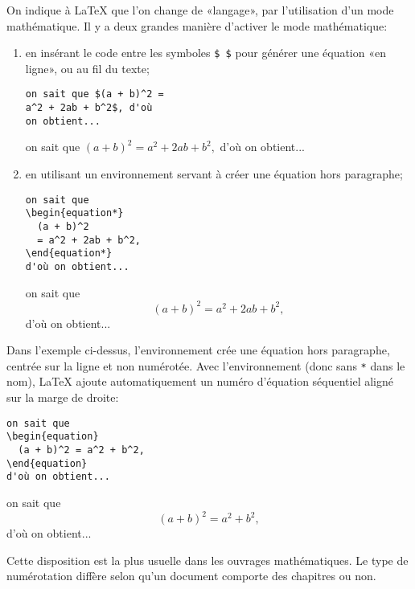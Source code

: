 On indique à {\LaTeX} que l'on change de «langage», par l'utilisation
d'un mode mathématique. Il y a deux grandes manière d'activer le mode
mathématique:
\begin{enumerate}
\item en insérant le code entre les symboles \verb=$ $= pour générer
  une équation «en ligne», ou au fil du texte;
  \begin{demo}
    \begin{texample}
\begin{lstlisting}
on sait que $(a + b)^2 =
a^2 + 2ab + b^2$, d'où
on obtient...
\end{lstlisting}
      \producing
      on sait que $(a + b)^2 = a^2 + 2ab + b^2,$ d'où on obtient...
    \end{texample}
  \end{demo}
\item en utilisant un environnement servant à créer une équation hors
  paragraphe;
  \begin{demo}
    \begin{texample}
\begin{lstlisting}
on sait que
\begin{equation*}
  (a + b)^2
  = a^2 + 2ab + b^2,
\end{equation*}
d'où on obtient...
\end{lstlisting}
      \producing
      on sait que
      \begin{equation*}
        (a + b)^2 = a^2 + 2ab + b^2,
      \end{equation*}
      d'où on obtient...
    \end{texample}
  \end{demo}
\end{enumerate}

Dans l'exemple ci-dessus, l'environnement  crée une
équation hors paragraphe, centrée sur la ligne et non numérotée.
Avec l'environnement  (donc sans \verb=*= dans le nom),
{\LaTeX} ajoute automatiquement un numéro d'équation séquentiel aligné
sur la marge de droite:
\begin{demo}
  \begin{texample}
\begin{lstlisting}
on sait que
\begin{equation}
  (a + b)^2 = a^2 + b^2,
\end{equation}
d'où on obtient...
\end{lstlisting}
    \producing
    on sait que
    \begin{equation}
      (a + b)^2 = a^2 + b^2,
    \end{equation}
    d'où on obtient...
  \end{texample}
\end{demo}
Cette disposition est la plus usuelle dans les ouvrages mathématiques.
Le type de numérotation diffère selon qu'un document comporte des
chapitres ou non.

